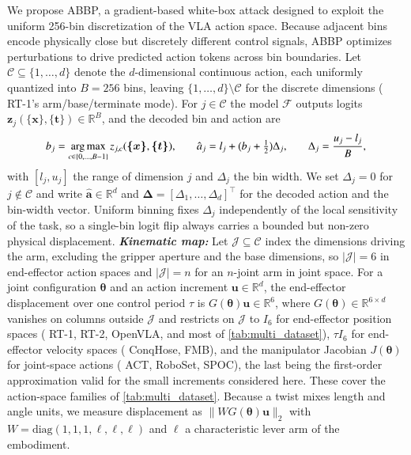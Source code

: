 {} 
We propose ABBP, a gradient-based white-box attack designed to exploit the uniform 256-bin discretization of the VLA action space. Because adjacent bins encode physically close but discretely different control signals, ABBP optimizes perturbations to drive predicted action tokens across bin boundaries.
Let $\mathcal{C}\subseteq\{1,\dots,d\}$ denote the $d$-dimensional continuous action, each uniformly quantized into $B{=}256$ bins, leaving $\{1,\dots,d\}\setminus\mathcal{C}$ for the discrete dimensions ({\eg} RT-1's arm/base/terminate mode). For $j\in\mathcal{C}$ the model $\mathcal{F}$ outputs logits $\bm{z}_j(\bm{\{x\}}, \bm{\{t\}})\in\mathbb{R}^{B}$, and the decoded bin and action are 
\vspace{-1ex}\begin{equation} 
  \small b_j=\argmax_{c\in\{0,\dots,B-1\}} z_{j,c}(\bm{\{x\}}, \bm{\{t\}}), \qquad \hat a_j=l_j+\bigl(b_j+\tfrac{1}{2}\bigr)\Delta_j, \qquad \Delta_j=\frac{u_j-l_j}{B}, 
  \label{eq:abbp-quant} 
\vspace{-1.5ex}
\end{equation} 
with $[l_j,u_j]$ the range of dimension $j$ and $\Delta_j$ the bin width. We set $\Delta_j{=}0$ for $j\notin\mathcal{C}$ and write $\hat{\bm{a}}\in\mathbb{R}^{d}$ and $\bm{\Delta}=[\Delta_1,\dots,\Delta_d]^{\top}$ for the decoded action and the bin-width vector. Uniform binning fixes $\Delta_j$ independently of the local sensitivity of the task, so a single-bin logit flip always carries a bounded but non-zero physical displacement. 
{\bf \emph{Kinematic map:}} Let $\mathcal{J}\subseteq\mathcal{C}$ index the dimensions driving the arm, excluding the gripper aperture and the base dimensions, so $|\mathcal{J}|{=}6$ in end-effector action spaces and $|\mathcal{J}|{=}n$ for an $n$-joint arm in joint space. For a joint configuration $\bm{\theta}$ and an action increment $\bm{u}\in\mathbb{R}^{d}$, the end-effector displacement over one control period $\tau$ is $G(\bm{\theta})\bm{u}\in\mathbb{R}^{6}$, where $G(\bm{\theta})\in\mathbb{R}^{6\times d}$ vanishes on columns outside $\mathcal{J}$ and restricts on $\mathcal{J}$ to $I_{6}$ for end-effector position spaces ({\eg} RT-1, RT-2, OpenVLA, and most of \autoref{tab:multi_dataset}), $\tau I_{6}$ for end-effector velocity spaces ({\eg} ConqHose, FMB), and the manipulator Jacobian $J(\bm{\theta})$ for joint-space actions ({\eg} ACT, RoboSet, SPOC), the last being the first-order approximation valid for the small increments considered here. These cover the action-space families of \autoref{tab:multi_dataset}. Because a twist mixes length and angle units, we measure displacement as $\|W G(\bm{\theta})\bm{u}\|_{2}$ with $W=\mathrm{diag}(1,1,1,\ell,\ell,\ell)$ and $\ell$ a characteristic lever arm of the embodiment.


